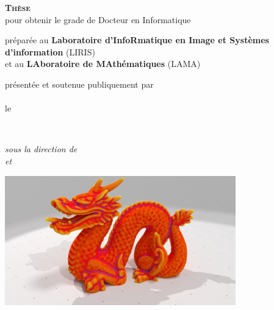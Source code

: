 %
%
%
\begin{titlepage}
	\begin{addmargin}[-3.5cm]{-3cm}
    \begin{center}
        \large

        \hfill

        \textsc{\Large\textbf{Thèse}}\\
        pour obtenir le grade de {Docteur} en {Informatique} \\ \bigskip



        préparée au \textbf{\normalsize Laboratoire d'InfoRmatique en Image et Systèmes d'information} (LIRIS)\\%
        et au \textbf{\normalsize LAboratoire de MAthématiques} (LAMA)\\ \medskip %


        présentée et soutenue publiquement par \\
        \textsc{\Large\textbf{\sayMyName}} \\
        le \textsc{\thesisDate}

        \vfill

        \begingroup
            \color{Maroon}\huge{\textsc{\thesisTitle}} \\ %
        \endgroup




        \textit{sous la direction de \\
        \textbf{\thesisFirstSupervisor} et \textbf{\thesisSecondSupervisor}} \\ %

				\vfill

				\includegraphics[width=10cm]{images/Teaser}



\end{center}
\end{addmargin}
\end{titlepage}
